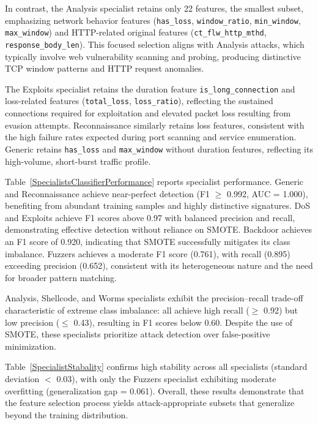 \documentclass[pdflatex,sn-mathphys-num]{sn-jnl}
\theoremstyle{thmstyleone}%
\theoremstyle{thmstyletwo}%
\theoremstyle{thmstylethree}%
\begin{document}
In contrast, the Analysis specialist retains only 22 features, the smallest subset, emphasizing network behavior features (\texttt{has\_loss}, \texttt{window\_ratio}, \texttt{min\_window}, \texttt{max\_window}) and HTTP-related original features (\texttt{ct\_flw\_http\_mthd}, \texttt{response\_body\_len}). This focused selection aligns with Analysis attacks, which typically involve web vulnerability scanning and probing, producing distinctive TCP window patterns and HTTP request anomalies.

The Exploits specialist retains the duration feature \texttt{is\_long\_connection} and loss-related features (\texttt{total\_loss}, \texttt{loss\_ratio}), reflecting the sustained connections required for exploitation and elevated packet loss resulting from evasion attempts. Reconnaissance similarly retains loss features, consistent with the high failure rates expected during port scanning and service enumeration. Generic retains \texttt{has\_loss} and \texttt{max\_window} without duration features, reflecting its high-volume, short-burst traffic profile.

Table~\ref{SpecialistsClassifierPerformance} reports specialist performance. Generic and Reconnaissance achieve near-perfect detection (F1 $\geq$ 0.992, AUC = 1.000), benefiting from abundant training samples and highly distinctive signatures. DoS and Exploits achieve F1 scores above 0.97 with balanced precision and recall, demonstrating effective detection without reliance on SMOTE. Backdoor achieves an F1 score of 0.920, indicating that SMOTE successfully mitigates its class imbalance. Fuzzers achieves a moderate F1 score (0.761), with recall (0.895) exceeding precision (0.652), consistent with its heterogeneous nature and the need for broader pattern matching.

Analysis, Shellcode, and Worms specialists exhibit the precision--recall trade-off characteristic of extreme class imbalance: all achieve high recall ($\geq$ 0.92) but low precision ($\leq$ 0.43), resulting in F1 scores below 0.60. Despite the use of SMOTE, these specialists prioritize attack detection over false-positive minimization.

Table~\ref{SpecialistStabality} confirms high stability across all specialists (standard deviation $<$ 0.03), with only the Fuzzers specialist exhibiting moderate overfitting (generalization gap = 0.061). Overall, these results demonstrate that the feature selection process yields attack-appropriate subsets that generalize beyond the training distribution.
\end{document}

